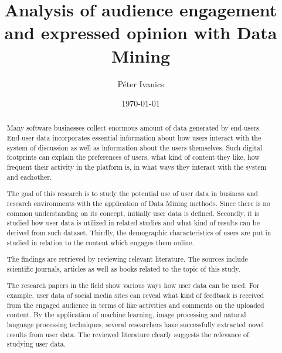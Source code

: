 \documentclass[english]{tktltiki}
\begin{document}
\onehalfspacing

\title{Analysis of audience engagement and expressed opinion with Data Mining}
\author{P\'eter Ivanics}

\date{\today}

\maketitle


\begin{abstract}
Many software businesses collect enormous amount of data generated by end-users. End-user data incorporates essential information about how users interact with the system of discussion as well as information about the users themselves. Such digital footprints can explain the preferences of users, what kind of content they like, how frequent their activity in the platform is, in what ways they interact with the system and eachother.

The goal of this research is to study the potential use of user data in business and research environments with the application of Data Mining methods. Since there is no common understanding on its concept, initially user data is defined. Secondly, it is studied how user data is utilized in related studies and what kind of results can be derived from such dataset. Thirdly, the demographic characteristics of users are put in studied in relation to the content which engages them online.

The findings are retrieved by reviewing relevant literature. The sources include scientific journals, articles as well as books related to the topic of this study. 

The research papers in the field show various ways how user data can be used. For example, user data of social media sites can reveal what kind of feedback is received from the engaged audience in terms of like activities and comments on the uploaded content. By the application of machine learning, image processing and natural language processing techniques, several researchers have successfully extracted novel results from user data. The reviewed literature clearly suggests the relevance of studying user data.
 
\end{abstract}
\end{document}
